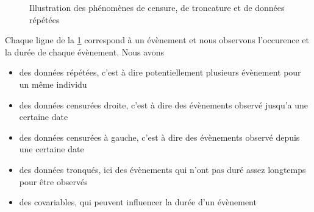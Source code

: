 \begin{figure}
\begin{center}
\end{center}
\caption{Illustration des phénomènes de censure, de troncature et de données répétées}
\label{fig:censored_truncated_data}
\end{figure}

Chaque ligne de la \cref{fig:censored_truncated_data} correspond à un évènement et nous observons l'occurence et la durée de chaque évènement. Nous avons
\begin{itemize}
\item des données répétées, c'est à dire potentiellement plusieurs évènement pour un même individu
\item des données censurées droite, c'est à dire des évènements observé jusqu'a une certaine date 
\item des données censurées à gauche, c'est à dire des évènements observé depuis une certaine date 
\item des données tronqués, ici des évènements qui n'ont pas duré assez longtemps pour être observés
\item des covariables, qui peuvent influencer la durée d'un évènement
\end{itemize}

